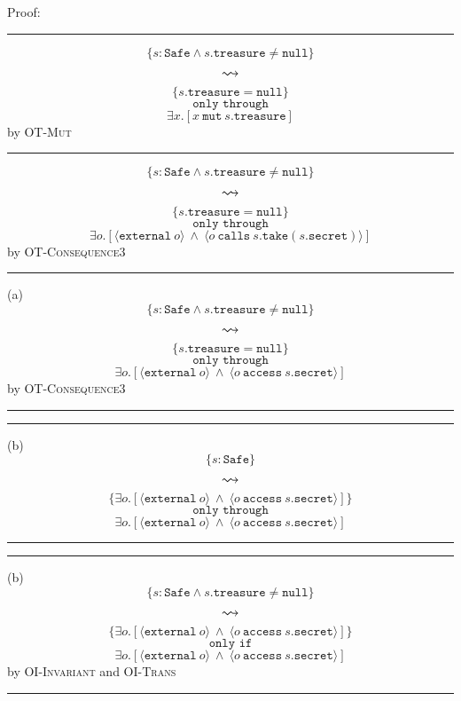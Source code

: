 \documentclass[12pt]{article}
\newcommand\trans[1]{\overset{#1}{\mathlarger{\mathlarger \leadsto}}}
\newcommand\mut[3]{#1\ \texttt{mut}\ #2.#3}
\begin{document}
\noindent Proof:
\vspace{3mm}
\footnotesize
\hrule
\vspace{3mm}
$$
	\{s : \texttt{Safe} \wedge s.\texttt{treasure} \neq \texttt{null}\}
$$
$$\trans{}$$
$$
	\{s.\texttt{treasure} = \texttt{null} \}
$$
$$\texttt{only through}$$
$$
	\exists x.[\mut{x}{s}{\texttt{treasure}}]
$$
\hfill by \textsc{OT-Mut}
\hrule
\vspace{3mm}
$$
	\{s : \texttt{Safe} \wedge s.\texttt{treasure} \neq \texttt{null}\}
$$
$$\trans{}$$
$$
	\{s.\texttt{treasure} = \texttt{null} \}
$$
$$\texttt{only through}$$
$$
	\exists o. [\langle \texttt{external}\ o \rangle\ \wedge\ \langle o\ \texttt{calls}\ s.\texttt{take}(s.\texttt{secret}) \rangle]
$$
\hfill by \textsc{OT-Consequence3}
\hrule
\vspace{3mm}
(a)
$$
	\{s : \texttt{Safe} \wedge s.\texttt{treasure} \neq \texttt{null}\}
$$
$$\trans{}$$
$$
	\{s.\texttt{treasure} = \texttt{null} \}
$$
$$\texttt{only through}$$
$$
	\exists o. [\langle \texttt{external}\ o \rangle\ \wedge\ \langle o\ \texttt{access}\ s.\texttt{secret} \rangle]
$$
\hfill by \textsc{OT-Consequence3}
\hrule
\vspace{3mm}
\normalsize
{}
\vspace{3mm}
\footnotesize
\hrule
\vspace{3mm}
(b)
$$
	\{s : \texttt{Safe} \}
$$
$$\trans{}$$
$$
	\{\exists o. [\langle \texttt{external}\ o \rangle\ \wedge\ \langle o\ \texttt{access}\ s.\texttt{secret} \rangle]\}
$$
$$\texttt{only through}$$
$$
	\exists o. [\langle \texttt{external}\ o \rangle\ \wedge\ \langle o\ \texttt{access}\ s.\texttt{secret} \rangle]
$$
\hrule
\vspace{3mm}
\normalsize
{}
\vspace{3mm}
\footnotesize
\hrule
\vspace{3mm}
(b)
$$
	\{s : \texttt{Safe}  \wedge s.\texttt{treasure} \neq \texttt{null}\}
$$
$$\trans{}$$
$$
	\{\exists o. [\langle \texttt{external}\ o \rangle\ \wedge\ \langle o\ \texttt{access}\ s.\texttt{secret} \rangle]\}
$$
$$\texttt{only if}$$
$$
	\exists o. [\langle \texttt{external}\ o \rangle\ \wedge\ \langle o\ \texttt{access}\ s.\texttt{secret} \rangle]
$$
\hfill by \textsc{OI-Invariant} and \textsc{OI-Trans}
\hrule
\vspace{3mm}
\normalsize

\newpage
\end{document}
